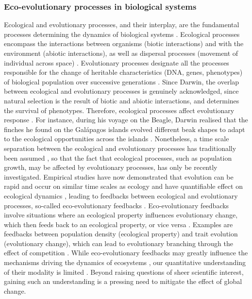 \subsubsection*{Eco-evolutionary processes in biological systems}
% 
Ecological and evolutionary processes, and their interplay, are the fundamental processes determining the dynamics of biological systems \cite{Pelletier2009}.
% 
Ecological processes encompass the interactions between organisms (biotic interactions) and with the environment (abiotic interactions), as well as dispersal processes (movement of individual across space) \cite{Vellend2010a}.
% 
Evolutionary processes designate all the processes responsible for the change of heritable characteristics (DNA, genes, phenotypes) of biological population over successive generations \cite{Hall2013}.
% 
Since Darwin, the overlap between ecological and evolutionary processes is genuinely acknowledged, since natural selection is the result of biotic and abiotic interactions, and determines the survival of phenotypes. Therefore, ecological processes affect evolutionary response \cite{Ezard2009}.
% 
For instance, during his voyage on the Beagle, Darwin realised that the finches he found on the Galápagos islands evolved different beak shapes to adapt to the ecological opportunities across the islands \cite{darwin2004origin}.
% 
Nonetheless, a time scale separation between the ecological and evolutionary processes has traditionally been assumed \cite{slobodkin1980growth}, so that the fact that ecological processes, such as population growth, may be affected by evolutionary processes, has only be recently investigated. Empirical studies have now demonstrated that evolution can be rapid and occur on similar time scales as ecology \cite{Hairston2005, Pelletier2009} and have quantifiable effect on ecological dynamics \cite{Ezard2009}, leading to feedbacks between ecological and evolutionary processes, so-called eco-evolutionary feedbacks \cite{Pelletier2009,Schoener2011}. 
% 
Eco-evolutionary feedbacks involve situations where an ecological property influences evolutionary change, which then feeds back to an ecological property, or vice versa \cite{Govaert2019a}. Examples are feedbacks between population density (ecological property) and trait evolution (evolutionary change), which can lead to evolutionary branching through the effect of competition \cite{Doebeli1999}.
% 
While eco-evolutionary feedbacks may greatly influence the mechanisms driving the dynamics of ecosystems \cite{Urban2016}, our quantitative understanding of their modality is limited \cite{Lion2022}. Beyond raising questions of sheer scientific interest, gaining such an understanding is a pressing need to mitigate the effect of global change.

